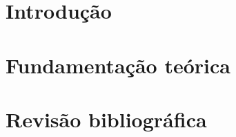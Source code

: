 \documentclass[oneside,monografia]{iftex2020}
\begin{document}
\maketitle

\chapter{Introdução} \label{cap:introducao}



\chapter{Fundamentação teórica}



\chapter{Revisão bibliográfica}




%


%


%

\end{document}
